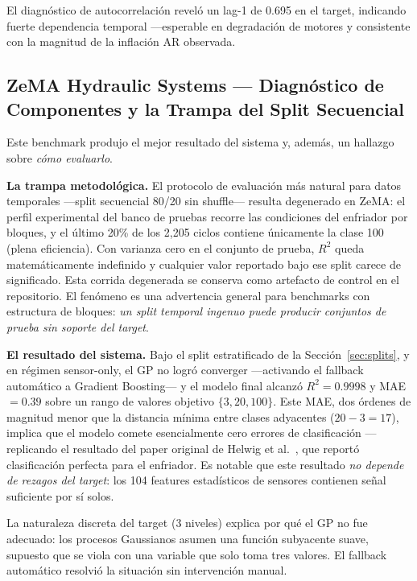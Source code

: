 \documentclass[10pt]{article}
\begin{document}
El diagnóstico de autocorrelación reveló un lag-1 de 0.695 en el target, indicando fuerte dependencia temporal ---esperable en degradación de motores y consistente con la magnitud de la inflación AR observada.

\subsection{ZeMA Hydraulic Systems --- Diagnóstico de Componentes y la Trampa del Split Secuencial}
\label{sec:zema}

Este benchmark produjo el mejor resultado del sistema y, además, un hallazgo sobre \emph{cómo evaluarlo}.

\textbf{La trampa metodológica.} El protocolo de evaluación más natural para datos temporales ---split secuencial 80/20 sin shuffle--- resulta degenerado en ZeMA: el perfil experimental del banco de pruebas recorre las condiciones del enfriador por bloques, y el último 20\% de los 2,205 ciclos contiene únicamente la clase 100 (plena eficiencia). Con varianza cero en el conjunto de prueba, $R^2$ queda matemáticamente indefinido y cualquier valor reportado bajo ese split carece de significado. Esta corrida degenerada se conserva como artefacto de control en el repositorio. El fenómeno es una advertencia general para benchmarks con estructura de bloques: \emph{un split temporal ingenuo puede producir conjuntos de prueba sin soporte del target}.

\textbf{El resultado del sistema.} Bajo el split estratificado de la Sección~\ref{sec:splits}, y en régimen sensor-only, el GP no logró converger ---activando el fallback automático a Gradient Boosting--- y el modelo final alcanzó $R^2 = 0.9998$ y MAE $= 0.39$ sobre un rango de valores objetivo $\{3, 20, 100\}$. Este MAE, dos órdenes de magnitud menor que la distancia mínima entre clases adyacentes ($20 - 3 = 17$), implica que el modelo comete esencialmente cero errores de clasificación ---replicando el resultado del paper original de Helwig et al.\ \cite{helwig2015}, que reportó clasificación perfecta para el enfriador. Es notable que este resultado \emph{no depende de rezagos del target}: los 104 features estadísticos de sensores contienen señal suficiente por sí solos.

La naturaleza discreta del target (3 niveles) explica por qué el GP no fue adecuado: los procesos Gaussianos asumen una función subyacente suave, supuesto que se viola con una variable que solo toma tres valores. El fallback automático resolvió la situación sin intervención manual.
\end{document}
